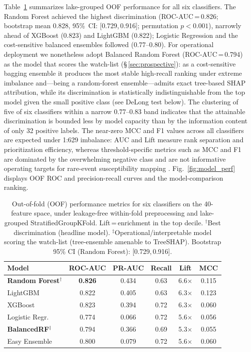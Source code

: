 \documentclass[pdflatex,sn-basic]{sn-jnl}%
\begin{document}
Table~\ref{tab:model_comparison} summarizes lake-grouped OOF performance
for all six classifiers. The Random Forest achieved the highest
discrimination (ROC-AUC\,=\,0.826; bootstrap mean 0.828, 95\%~CI:
[0.729,\,0.916]; permutation $p<0.001$), narrowly ahead of XGBoost
(0.823) and LightGBM (0.822); Logistic Regression and the cost-sensitive
balanced ensembles followed (0.77--0.80). For operational deployment we
nonetheless adopt Balanced Random Forest (ROC-AUC\,=\,0.794) as the model
that scores the watch-list (\S\,\ref{sec:prospective}): as a
cost-sensitive bagging ensemble it produces the most stable high-recall
ranking under extreme imbalance and---being a random-forest
ensemble---admits exact tree-based SHAP attribution, while its
discrimination is statistically indistinguishable from the top model given
the small positive class (see DeLong test below). The clustering of five of
six classifiers within a narrow 0.77--0.83 band indicates that the
attainable discrimination is bounded less by model capacity than by the
information content of only 32 positive labels.
The near-zero MCC and F1 values across all classifiers are expected
under 1:629 imbalance: AUC and Lift measure rank separation and
prioritization efficiency, whereas threshold-specific metrics such as
MCC and F1 are dominated by the overwhelming negative class and are not
informative operating targets for rare-event susceptibility mapping
\citep{Chicco2020,Lobo2008}.
Fig.~\ref{fig:model_perf} displays OOF ROC and precision-recall
curves and the model-comparison ranking.

\begin{table}[!t]
\caption{Out-of-fold (OOF) performance metrics for six classifiers on
  the 40-feature space, under leakage-free within-fold preprocessing and
  lake-grouped StratifiedGroupKFold. Lift\,=\,enrichment in the top decile.
  $^\dagger$Best discrimination (headline model).
  $^\ddagger$Operational/interpretable model scoring the watch-list
  (tree-ensemble amenable to TreeSHAP). Bootstrap 95\% CI (Random Forest):
  [0.729,\,0.916].}
\label{tab:model_comparison}
\centering
\begin{tabular}{lccccc}
\toprule
\textbf{Model} & \textbf{ROC-AUC} & \textbf{PR-AUC}
  & \textbf{Recall} & \textbf{Lift} & \textbf{MCC} \\
\midrule
\textbf{Random Forest}$^\dagger$ & \textbf{0.826} & 0.434 & 0.63 & 6.6$\times$ & 0.115 \\
LightGBM       & 0.822 & 0.405 & 0.63 & 6.3$\times$ & 0.123 \\
XGBoost        & 0.823 & 0.394 & 0.72 & 6.3$\times$ & 0.060 \\
Logistic Regr. & 0.774 & 0.066 & 0.72 & 5.6$\times$ & 0.056 \\
\textbf{BalancedRF}$^\ddagger$ & 0.794 & 0.366 & 0.69 & 5.3$\times$ & 0.055 \\
Easy Ensemble  & 0.800 & 0.079 & 0.72 & 5.6$\times$ & 0.060 \\
\bottomrule
\end{tabular}
\end{table}
\end{document}
